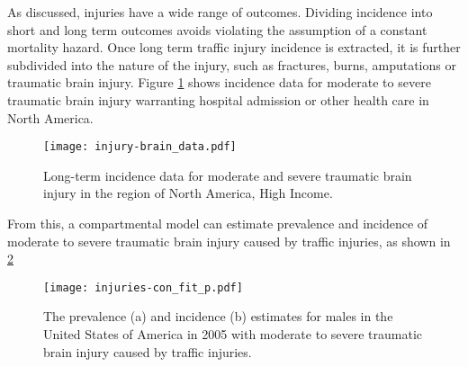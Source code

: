 As discussed, injuries have a wide range of outcomes.  Dividing incidence into short and long term outcomes avoids violating the assumption of a constant mortality hazard.  Once long term traffic injury incidence is extracted, it is further subdivided into the nature of the injury, such as fractures, burns, amputations or traumatic brain injury.  Figure \ref{fig:app-injury brain data} shows incidence data for moderate to severe traumatic brain injury warranting hospital admission or other health care in North America.

    \begin{figure}[h]
        \begin{center}
            \texttt{[image: injury-brain\_data.pdf]}
            \caption{Long-term incidence data for moderate and severe traumatic brain injury in the region of North America, High Income.}
            \label{fig:app-injury brain data}
        \end{center}
    \end{figure}

From this, a compartmental model can estimate prevalence and incidence of moderate to severe traumatic brain injury caused by traffic injuries, as shown in \ref{fig:app-injury brain fit}

    \begin{figure}[h]
        \begin{center}
            \texttt{[image: injuries-con\_fit\_p.pdf]}
            \caption{The prevalence (a) and incidence (b) estimates for males in the United States of America in 2005 with moderate to severe traumatic brain injury caused by traffic injuries.}
            \label{fig:app-injury brain fit}
        \end{center}
    \end{figure}



